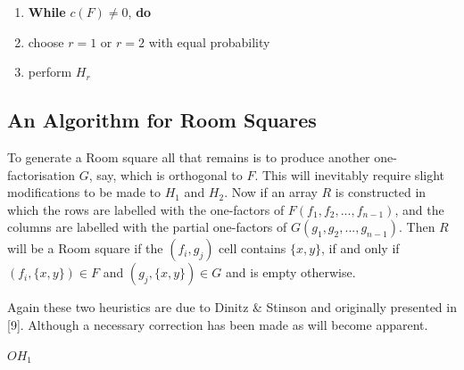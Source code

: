 \documentclass[
  12pt,
  a4paper]{book}
\begin{document}
\begin{enumerate}
\def\labelenumi{\arabic{enumi}.}
\item
  \textbf{While} \(c(F) \neq 0\), \textbf{do}
\item
  choose \(r=1\) or \(r=2\) with equal probability
\item
  perform \(H_r\)
\end{enumerate}

\hypertarget{an-algorithm-for-room-squares}{%
\subsection{An Algorithm for Room
Squares}\label{an-algorithm-for-room-squares}}

To generate a Room square all that remains is to produce another
one-factorisation \(G\), say, which is orthogonal to \(F\). This will
inevitably require slight modifications to be made to \(H_1\) and
\(H_2\). Now if an array \(R\) is constructed in which the rows are
labelled with the one-factors of \(F(f_1,f_2,...,f_{n-1})\), and the
columns are labelled with the partial one-factors of
\(G(g_1,g_2,...,g_{n-1})\). Then \(R\) will be a Room square if the
\((f_i,g_j)\) cell contains \(\{x,y\}\), if and only if
\((f_i,\{x,y\}) \in F\) and \((g_j,\{x,y\}) \in G\) and is empty
otherwise.

Again these two heuristics are due to Dinitz \& Stinson and originally
presented in {[}9{]}. Although a necessary correction has been made as
will become apparent.

\(OH_1\)
\end{document}
